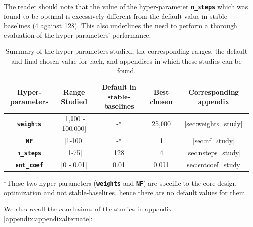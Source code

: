 \documentclass[a4paper]{article}
\newcommand{\code}[1]{\colorbox{light-gray}{\small\color{blue}\textbf{\texttt{#1}}}}
\begin{document}
The reader should note that the value of the hyper-parameter \code{n\_steps} which was found to be optimal is excessively different from the default value in stable-baselines (4 against 128). This also underlines the need to perform a thorough evaluation of the hyper-parameters' performance.
\begin{table}[H]
    \centering
        \caption{Summary of the hyper-parameters studied, the corresponding ranges, the default and final chosen value for each, and appendices in which these studies can be found.}
    \begin{tabular}{c|c|c|c|c}
    \hline
    Hyper-parameters & Range Studied & Default in stable-baselines & Best chosen & Corresponding appendix \\
    \hline
     \code{weights}    &  [1,000 - 100,000] & -$^{\star}$ & 25,000 & \ref{sec:weights_study}\\
     \code{NF}    &  [1-100] & -$^{\star}$ & 1 & \ref{sec:nf_study}\\
     \code{n\_steps} & [1-75] & 128 & 4 & \ref{sec:nsteps_study}\\
     \code{ent\_coef} & [0 - 0.01] & 0.01 & 0.001 & \ref{sec:entcoef_study}\\
     \hline
    \end{tabular}
    \label{tab:summaryofhyper}
    \begin{tablenotes}
      \item  \footnotesize$^{\star}$These two hyper-parameters (\code{weights} and \code{NF}) are specific to the core design optimization and not stable-baselines, hence there are no default values for them.
    \end{tablenotes}
\end{table}
We also recall the conclusions of the studies in appendix \ref{appendix:appendixalternate}:
\end{document}
